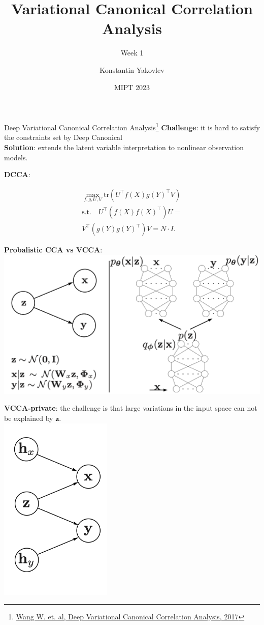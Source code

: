 \documentclass[aspectratio=169]{beamer}
\title[Week 1]
{Variational Canonical Correlation Analysis}
\subtitle{Week 1}
\author[] %
{
Konstantin Yakovlev \inst{1} \and
}
\institute[] %
{
  \inst{1}%
  MIPT \\
  Moscow, Russia
}
\date[MIPT 2023] %
{MIPT 2023}
\begin{document}
\frame{\titlepage}

\begin{frame}{Deep Variational Canonical Correlation Analysis\footnote{\href{https://arxiv.org/pdf/1610.03454.pdf}{Wang W. et. al, Deep Variational Canonical Correlation Analysis, 2017}}}
    \textbf{Challenge}: it is hard to satisfy the constraints set by Deep Canonical \\
    \textbf{Solution}: extends the latent variable interpretation to nonlinear observation models.
    \begin{minipage}{0.33\textwidth}
        \textbf{DCCA}:
        \begin{small}
        \begin{align*}
            \max_{f, g, U, V}\mathrm{tr}(U^\top f(X)g(Y)^\top V) \\
            \mathrm{s.t.} \quad U^\top(f(X)f(X)^\top)U = \\
            V^\top(g(Y)g(Y)^\top)V = N\cdot I.
        \end{align*}
        \end{small}
    \end{minipage}\hfill
    \begin{minipage}{0.33\textwidth}
        \textbf{Probalistic CCA vs VCCA}: \\
        \includegraphics[width=\textwidth]{figures/fig1.png}
    \end{minipage}\hfill
    \begin{minipage}{0.33\textwidth}
        \textbf{VCCA-private}:  the challenge is that large variations in the input space can not be explained by $\mathbf{z}$.\\
        \includegraphics[width=0.4\textwidth]{figures/fig2.png}

\end{minipage}
\end{frame}
\end{document}
